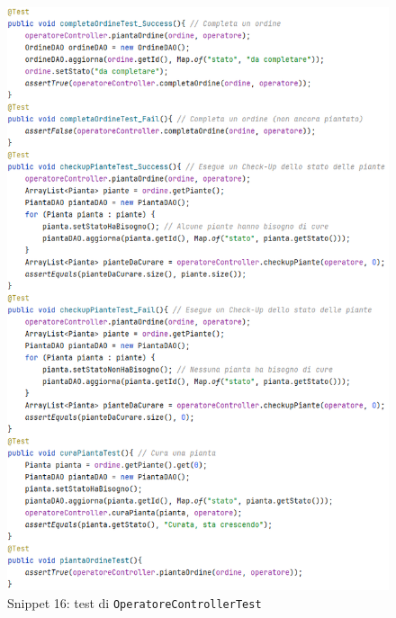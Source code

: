 \documentclass{article}
\newcommand{\code}[1]{\texttt{#1}}
\begin{document}
\begin{figure}[H]
    \centering
    \includegraphics[scale=0.65]{resources/images/Snippets/snippet_OperatoreControllerTest.png}
    \captionsetup{labelformat=empty,labelsep=none}
    \caption{Snippet 16: test di \code{OperatoreControllerTest}}
    \label{fig:snippet_OperatoreControllerTest}
\end{figure}
\end{document}
